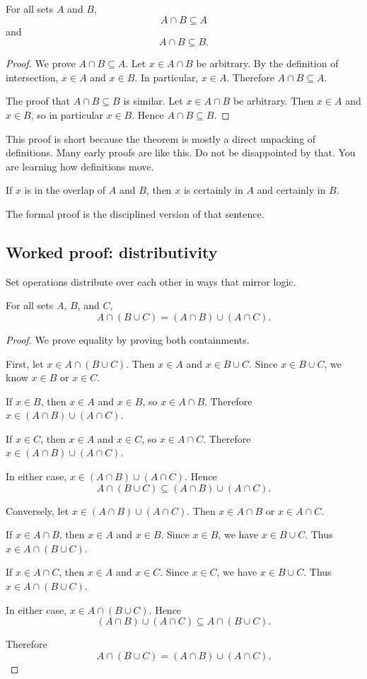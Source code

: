 \begin{theorem}
For all sets $A$ and $B$,
\[
A\cap B\subseteq A
\]
and
\[
A\cap B\subseteq B.
\]
\end{theorem}

\begin{proof}
We prove $A\cap B\subseteq A$. Let $x\in A\cap B$ be arbitrary. By the definition of intersection, $x\in A$ and $x\in B$. In particular, $x\in A$. Therefore $A\cap B\subseteq A$.

The proof that $A\cap B\subseteq B$ is similar. Let $x\in A\cap B$ be arbitrary. Then $x\in A$ and $x\in B$, so in particular $x\in B$. Hence $A\cap B\subseteq B$.
\end{proof}

This proof is short because the theorem is mostly a direct unpacking of definitions. Many early proofs are like this. Do not be disappointed by that. You are learning how definitions move.

\begin{intuitionbox}
If $x$ is in the overlap of $A$ and $B$, then $x$ is certainly in $A$ and certainly in $B$.
\end{intuitionbox}

The formal proof is the disciplined version of that sentence.

\subsection{Worked proof: distributivity}

Set operations distribute over each other in ways that mirror logic.

\begin{theorem}
For all sets $A$, $B$, and $C$,
\[
A\cap(B\cup C)=(A\cap B)\cup(A\cap C).
\]
\end{theorem}

\begin{proof}
We prove equality by proving both containments.

First, let $x\in A\cap(B\cup C)$. Then $x\in A$ and $x\in B\cup C$. Since $x\in B\cup C$, we know $x\in B$ or $x\in C$.

If $x\in B$, then $x\in A$ and $x\in B$, so $x\in A\cap B$. Therefore $x\in (A\cap B)\cup(A\cap C)$.

If $x\in C$, then $x\in A$ and $x\in C$, so $x\in A\cap C$. Therefore $x\in (A\cap B)\cup(A\cap C)$.

In either case, $x\in (A\cap B)\cup(A\cap C)$. Hence
\[
A\cap(B\cup C)\subseteq (A\cap B)\cup(A\cap C).
\]

Conversely, let $x\in (A\cap B)\cup(A\cap C)$. Then $x\in A\cap B$ or $x\in A\cap C$.

If $x\in A\cap B$, then $x\in A$ and $x\in B$. Since $x\in B$, we have $x\in B\cup C$. Thus $x\in A\cap(B\cup C)$.

If $x\in A\cap C$, then $x\in A$ and $x\in C$. Since $x\in C$, we have $x\in B\cup C$. Thus $x\in A\cap(B\cup C)$.

In either case, $x\in A\cap(B\cup C)$. Hence
\[
(A\cap B)\cup(A\cap C)\subseteq A\cap(B\cup C).
\]

Therefore
\[
A\cap(B\cup C)=(A\cap B)\cup(A\cap C).
\]
\end{proof}

